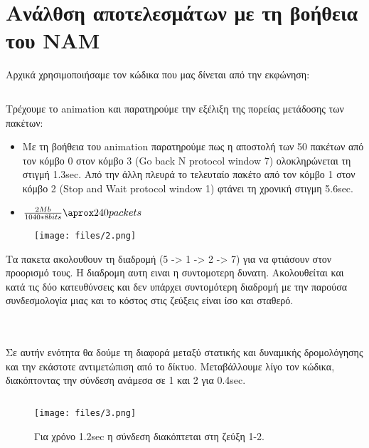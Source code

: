 \documentclass[a4paper,9pt]{article}
\begin{document}
\def\thesection {\Roman{section}.}



\section*{Aνάλθση αποτελεσμάτων με τη βοήθεια του NAM}
Αρχικά χρησιμοποιήσαμε τον κώδικα που μας δίνεται από την εκφώνηση:

\inputminted[fontsize=\footnotesize]{tcl}{files/ex1_1.tcl}


Τρέχουμε το animation και παρατηρούμε την εξέλιξη της πορείας μετάδοσης των
πακέτων:

\begin{itemize}
    \item Με τη βοήθεια του animation παρατηρούμε πως η αποστολή των 50
    πακέτων από τον κόμβο 0 στον κόμβο 3 (Go back N protocol window 7) ολοκληρώνεται τη
    στιγμή 1.3sec. Από την άλλη πλευρά το τελευταίο πακέτο από τον κόμβο 1
    στον κόμβο 2 (Stop and Wait protocol window 1) φτάνει τη χρονική στιγμη
    5.6sec.
    \item $\frac{2Mb}{1040*8bits}\aprox240packets$
\end{itemize}

\begin{figure}[H]
    \centering
    \texttt{[image: files/2.png]}
\end{figure}

Τα πακετα ακολουθουν τη διαδρομή (5 -> 1 ->  2 -> 7)
για να φτιάσουν στον προορισμό τους. Η διαδρομη αυτη ειναι η συντομοτερη
δυνατη. Ακολουθείται και κατά τις δύο κατευθύνσεις και δεν υπάρχει συντομότερη
διαδρομή με την παρούσα συνδεσμολογία μιας και το κόστος στις ζεύξεις είναι
ίσο και σταθερό.


\inputminted[fontsize=\footnotesize]{tcl}{files/ex3_1.tcl}
\section{}
Σε αυτήν ενότητα θα δούμε τη διαφορά μεταξύ στατικής και δυναμικής
δρομολόγησης και την εκάστοτε αντιμετώπιση από το δίκτυο. Μεταβάλλουμε λίγο
τον κώδικα, διακόπτοντας την σύνδεση ανάμεσα σε 1 και 2 για 0.4sec.

\inputminted[fontsize=\footnotesize]{tcl}{files/ex3_2.tcl}

\begin{figure}[H]
    \centering
    \texttt{[image: files/3.png]}
    \caption{Για χρόνο 1.2sec η σύνδεση διακόπτεται στη ζεύξη 1-2.}
\end{figure}
\end{document}
